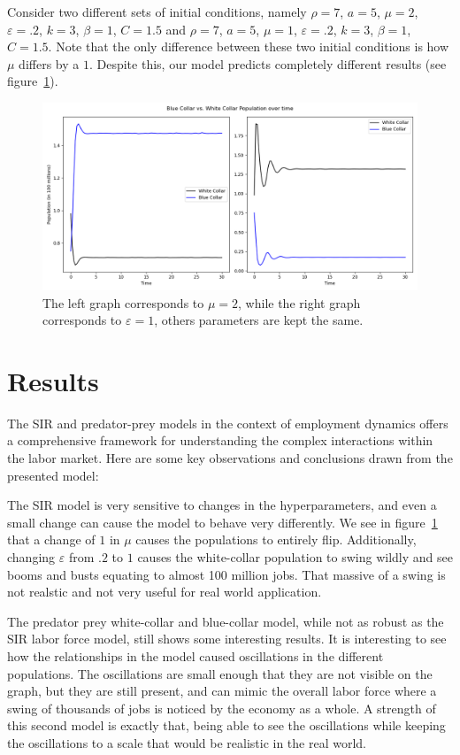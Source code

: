 \documentclass[11pt]{amsart}
\begin{document}
Consider two different sets of initial conditions, namely $\rho = 7$, $a = 5$, $\mu = 2$, $\varepsilon = .2$, $k = 3$, $\beta = 1$, $C = 1.5$ and 
$\rho = 7$, $a = 5$, $\mu = 1$, $\varepsilon = .2$, $k = 3$, $\beta = 1$, $C = 1.5$. Note that the only difference between these two initial conditions is
how $\mu$ differs by a $1$. Despite this, our model predicts completely different results (see figure~\ref{fig:results_wb_3}).

\begin{figure}[h]
    \centering
    \includegraphics[width=.8\textwidth]{figures/bad_paramenters.png}
    \caption{The left graph corresponds to $\mu = 2$, while the right graph corresponds to $\varepsilon = 1$, others parameters are kept the same.}
    \label{fig:results_wb_3}
\end{figure}

\section{Results}
The SIR and predator-prey models in the context of employment dynamics offers a comprehensive framework for understanding 
the complex interactions within the labor market. Here are some key observations and conclusions drawn from the presented model:

The SIR model is very sensitive to changes in the hyperparameters, and even a small change can cause the model to behave very 
differently. We see in figure~\ref{fig:results_wb_3} that a change of $1$ in $\mu$ causes the populations to entirely flip. 
Additionally, changing $\varepsilon$ from $.2$ to $1$ causes the white-collar population to swing wildly and see booms and 
busts equating to almost 100 million jobs. That massive of a swing is not realstic and not very useful for real world application.

The predator prey white-collar and blue-collar model, while not as robust as the SIR labor force model, still shows some interesting results. It is interesting to see how the relationships in the model
caused oscillations in the different populations. The oscillations are small enough that they are not visible on the graph, but they are still present, and can mimic the overall 
labor force where a swing of thousands of jobs is noticed by the economy as a whole. A strength of this second model is exactly that, being able to see the oscillations while
keeping the oscillations to a scale that would be realistic in the real world.
\end{document}
